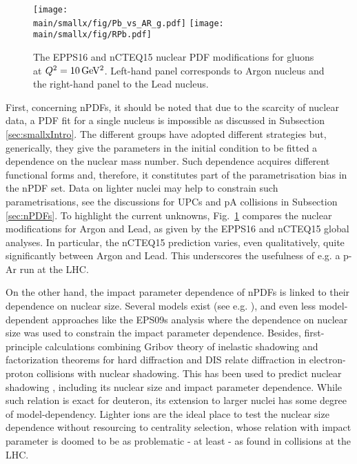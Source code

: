 \documentclass[../report.tex]{subfiles}
\providecommand{\main}{..}
\begin{document}
\begin{figure}[htb!]
\centering
\texttt{[image: \\main/smallx/fig/Pb\_vs\_AR\_g.pdf]}
\texttt{[image: \\main/smallx/fig/RPb.pdf]}
\caption{The EPPS16 and nCTEQ15 nuclear PDF modifications for gluons at $Q^2=10\,{\rm GeV^2}$. Left-hand panel corresponds to Argon nucleus and the right-hand panel to the Lead nucleus.}
\label{fig:lightnPDF}
\end{figure}

First, concerning nPDFs, it should be noted that due to the scarcity of nuclear data, a PDF fit for a single nucleus is impossible as discussed in Subsection \ref{sec:smallxIntro}. The different groups \cite{deFlorian:2011fp,Kovarik:2015cma,Eskola:2016oht}  have adopted different strategies but, generically, they give the parameters in the initial condition to be fitted a dependence on the nuclear mass number. Such dependence acquires different functional forms and, therefore, it constitutes part of the parametrisation bias in the nPDF set. Data on lighter nuclei may help to constrain such parametrisations, see the discussions for UPCs and pA collisions in Subsection \ref{sec:nPDFs}. To highlight the current unknowns, Fig.~\ref{fig:lightnPDF} compares the nuclear modifications for Argon and Lead, as given by the EPPS16 and nCTEQ15 global analyses. In particular, the nCTEQ15 prediction varies, even qualitatively, quite significantly between Argon and Lead. This underscores the usefulness of e.g. a p-Ar run at the LHC.  

On the other hand, the impact parameter dependence of nPDFs is linked to their dependence on nuclear size. Several models exist (see e.g. \cite{Emelyanov:1998phs,Ferreiro:2008wc}), and even less model-dependent approaches like the EPS09s analysis \cite{Helenius:2012wd} where the dependence on nuclear size was used to constrain the impact parameter dependence. Besides, first-principle calculations combining Gribov theory of inelastic shadowing and factorization theorems for hard diffraction and DIS relate diffraction in electron-proton collisions with nuclear shadowing. This has been used to predict nuclear shadowing \cite{Frankfurt:2011cs,Armesto:2003fi}, including its nuclear size and impact parameter dependence. While such relation is exact for deuteron, its extension to larger nuclei has some degree of model-dependency. Lighter ions are the ideal place to test the nuclear size dependence without resourcing to centrality selection, whose relation with impact parameter is doomed to be as problematic - at least - as found in \pPb collisions at the LHC.
\end{document}
